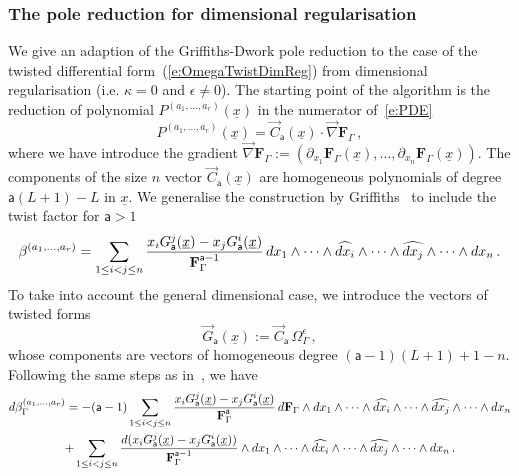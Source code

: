 \documentclass[a4paper,12pt]{article}
\numberwithin{equation}{section}
\numberwithin{figure}{section}
\begin{document}
  \subsubsection{The pole reduction for dimensional
    regularisation}\label{sec:PoleRed}
We give an adaption of the Griffiths-Dwork pole reduction to the case
of the twisted differential form~(\ref{e:OmegaTwistDimReg}) from
dimensional regularisation (i.e. $\kappa=0$ and $\epsilon\neq0$).
The starting point of the algorithm is the reduction of polynomial
$P^{(a_1,\dots,a_r)}(\underline x)$  in the numerator
of~\eqref{e:PDE}
\begin{equation}\label{e:RedF}
	P^{(a_1,\dots,a_r)}(\underline x) = \vec C_{\mathsf{a}}(\underline x)\cdot
	\vec\nabla   \textbf{F}_\Gamma \, ,
      \end{equation}
      where we have introduce the gradient $	\vec\nabla   \textbf{F}_\Gamma :=\left(\partial_{x_1}
      \textbf{F}_\Gamma(\underline x),\dots, \partial_{x_n}
      \textbf{F}_\Gamma(\underline x)\right)$.
%
The components of the size $n$ vector $ \vec C_{\mathsf{a}}(\underline x)$ are homogeneous polynomials of degree
$\mathsf{a}(L+1)-L$ in  $\underline x$. 
%
   We generalise the construction by
   Griffiths~\cite{Griffith1,Griffith2} to include the twist factor
   for $\mathsf{a}>1$ 
   \begin{equation}\label{e:betadef}
  \beta^{(a_1,\dots,a_r)}=  \sum_{1\leq i<j\leq n} {x_i
    G_{\mathsf{a}}^j  (\underline x)-x_j
   G_{\mathsf{a}}^i(\underline x)\over
  \textbf{F}_\Gamma^{\mathsf{a}-1}}\, 
 dx_1\wedge \cdots \wedge \widehat{dx_i}\wedge \cdots \wedge\widehat{dx_j}\wedge
  \cdots \wedge dx_n \, .
\end{equation}
To take into account the general dimensional case, we introduce 
the vectors of twisted forms
\begin{equation}
  \label{e:Gdef}
\vec  G_{\mathsf{a}}(\underline x):=   \vec C_{\mathsf{a}} \,\Omega_\Gamma^\epsilon \, ,
\end{equation}
whose components are vectors of homogeneous degree $(\mathsf{a}-1)(L+1)+1-n$. 
Following the same steps as in~\cite{Griffiths_1969}, we have
\begin{multline}
  d\beta_\Gamma^{(a_1,\dots,a_r)}=-  (\mathsf{a}-1) \sum_{1\leq i<j\leq n} {x_i
    G_{\mathsf{a}}^j  (\underline x)-x_j
   G_{\mathsf{a}}^i(\underline x)\over
   \textbf{F}_\Gamma^{\mathsf{a}}}\, d \textbf{F}_\Gamma\wedge
 dx_1\wedge \cdots \wedge \widehat{dx_i}\wedge \cdots \wedge\widehat{dx_j}\wedge
 \cdots \wedge dx_n \cr
+  \sum_{1\leq i<j\leq n} {d(x_i
    G_{\mathsf{a}}^j  (\underline x)-x_j
   G_{\mathsf{a}}^i(\underline x))\over
   \textbf{F}_\Gamma^{\mathsf{a}-1}}\wedge
 dx_1\wedge \cdots \wedge \widehat{dx_i}\wedge \cdots \wedge\widehat{dx_j}\wedge
  \cdots \wedge dx_n  \, .
\end{multline}
\end{document}
